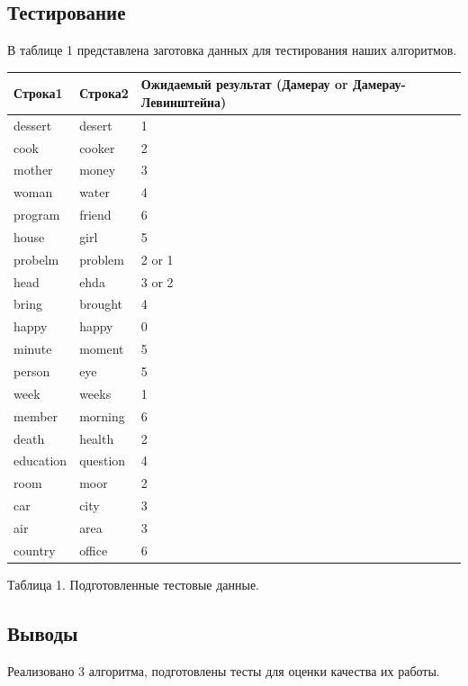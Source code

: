 \documentclass[a4paper,14pt]{article} %
\begin{document}
	\subsection{Тестирование}
	\hfill
	
	В таблице 1 представлена заготовка данных для тестирования наших алгоритмов. 
	\begin{center}
		\begin{tabular}{ | l | l | l |}
			\hline
			\textbf{Строка1} & \textbf{Строка2} & \textbf{Ожидаемый результат (Дамерау or Дамерау-Левинштейна)} \\ \hline
			dessert & desert & 1 \\ \hline
			cook & cooker & 2 \\ \hline
			mother & money & 3 \\ \hline
			woman & water & 4 \\ \hline
			program & friend & 6 \\ \hline
			house & girl & 5 \\ \hline
			probelm & problem & 2 or 1 \\ \hline
			head & ehda & 3 or 2 \\ \hline
			bring & brought & 4 \\ \hline
			happy & happy & 0\\  \hline
			minute & moment & 5 \\ \hline
			person & eye & 5 \\ \hline
			week & weeks & 1 \\ \hline
			member & morning & 6 \\ \hline
			death & health & 2 \\ \hline
			education & question & 4 \\ \hline
			room & moor & 2 \\ \hline
			car & city & 3 \\ \hline
			air & area & 3 \\ \hline
			country & office & 6 \\ \hline
		\end{tabular}
		
		\hfill
		
		Таблица 1.
		Подготовленные тестовые данные.  
	\end{center}
	\subsection{Выводы}
	
        \hfill
        
        Реализовано 3 алгоритма, подготовлены тесты для оценки качества их работы. 
        
\end{document}
